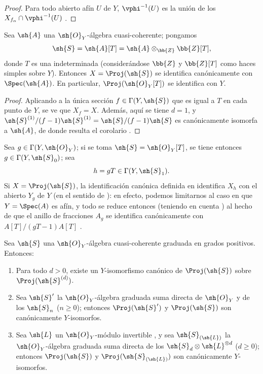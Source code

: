 \documentclass[oneside,10pt]{amsart}
\renewcommand{\geq}{\geqslant}
\newcommand{\oldpage}[2][]{\marginnote{\normalfont\footnotesize\textbf{#1}~|~#2}\ignorespaces}
\let\EGAOriginalLabel\label
\renewcommand{\label}[1]{\phantomsection\EGAOriginalLabel{#1}}
\begin{document}
\begin{proof}
Para todo abierto afín $U$ de $Y$, $\vphi^{-1}(U)$ es la unión de los $X_{f_\alpha}\cap\vphi^{-1}(U)$ .
\end{proof}

\begin{corollary}[3.1.7]
\label{II.3.1.7}
Sea $\sh{A}$ una $\sh{O}_Y$-álgebra cuasi-coherente; pongamos
\[
  \sh{S}=\sh{A}[T]=\sh{A}\otimes_{\bb{Z}}\bb{Z}[T],
\]
donde $T$ es una indeterminada (considerándose $\bb{Z}$ y $\bb{Z}[T]$ como haces simples sobre $Y$).
Entonces $X=\Proj(\sh{S})$ se identifica canónicamente con $\Spec(\sh{A})$.
En particular, $\Proj(\sh{O}_Y[T])$ se identifica con $Y$.
\end{corollary}

\begin{proof}
Aplicando  a la única sección $f\in\Gamma(Y,\sh{S})$ que es igual a $T$ en cada punto de $Y$, se ve que $X_f=X$.
Además, aquí se tiene $d=1$, y $\sh{S}^{(1)}/(f-1)\sh{S}^{(1)}=\sh{S}/(f-1)\sh{S}$ es canónicamente isomorfa a $\sh{A}$, de donde resulta el corolario .
\end{proof}

Sea $g\in\Gamma(Y,\sh{O}_Y)$; si se toma $\sh{S}=\sh{O}_Y[T]$, se tiene entonces $g\in\Gamma(Y,\sh{S}_0)$; sea
\[
  h=gT\in\Gamma(Y,\sh{S}_1).
\]
Si $X=\Proj(\sh{S})$, la identificación canónica definida en  identifica $X_h$ con el abierto $Y_g$ de $Y$ (en el sentido de ): en efecto, podemos limitarnos al caso en que $Y=\Spec(A)$ es afín, y todo se reduce entonces (teniendo en cuenta ) al hecho de que el anillo de fracciones $A_g$ se identifica canónicamente con $A[T]/(gT-1)A[T]$ .

\begin{proposition}[3.1.8]
\label{II.3.1.8}
Sea $\sh{S}$ una $\sh{O}_Y$-álgebra cuasi-coherente graduada en grados positivos.
Entonces:
\begin{enumerate}
  \item[(i)] Para todo $d>0$, existe un $Y$-isomorfismo canónico de $\Proj(\sh{S})$ sobre $\Proj(\sh{S}^{(d)})$.
\oldpage[II]{52}
  \item[(ii)] Sea $\sh{S}'$ la $\sh{O}_Y$-álgebra graduada suma directa de $\sh{O}_Y$ y de los $\sh{S}_n$ ($n\geq0$); entonces $\Proj(\sh{S}')$ y $\Proj(\sh{S})$ son canónicamente $Y$-isomorfos.
  \item[(iii)] Sea $\sh{L}$ un $\sh{O}_Y$-módulo invertible , y sea $\sh{S}_{(\sh{L})}$ la $\sh{O}_Y$-álgebra graduada suma directa de los $\sh{S}_d\otimes\sh{L}^{\otimes d}$ ($d\geq0$); entonces $\Proj(\sh{S})$ y $\Proj(\sh{S}_{(\sh{L})})$ son canónicamente $Y$-isomorfos.
\end{enumerate}
\end{proposition}
\end{document}
